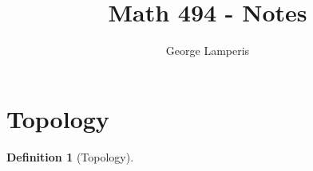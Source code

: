 \documentclass[12pt]{article}
\title{Math 494 - Notes}
\author{George Lamperis}
\date{}
\theoremstyle{mystyle}
\newtheorem{defn}[thm]{Definition}
\begin{document}
\maketitle



\section{Topology}
\begin{defn}[Topology]
\end{defn}


\end{document}
